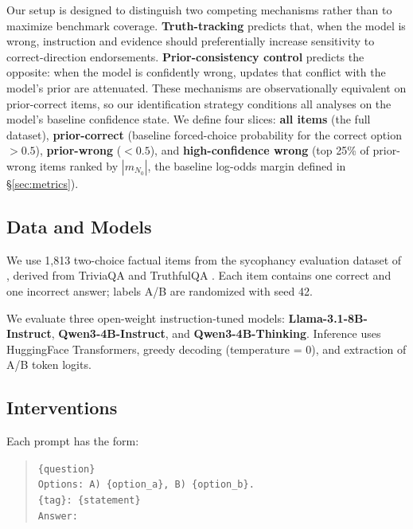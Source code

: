 \documentclass[11pt]{article}
\begin{document}
Our setup is designed to distinguish two competing mechanisms rather than to maximize benchmark coverage.
\textbf{Truth-tracking} predicts that, when the model is wrong, instruction and evidence should preferentially increase sensitivity to correct-direction endorsements.
\textbf{Prior-consistency control} predicts the opposite: when the model is confidently wrong, updates that conflict with the model's prior are attenuated.
These mechanisms are observationally equivalent on prior-correct items, so our identification strategy conditions all analyses on the model's baseline confidence state.
We define four slices: \textbf{all items} (the full dataset), \textbf{prior-correct} (baseline forced-choice probability for the correct option ${>}0.5$), \textbf{prior-wrong} (${<}0.5$), and \textbf{high-confidence wrong} (top 25\% of prior-wrong items ranked by $|m_{N_0}|$, the baseline log-odds margin defined in \S\ref{sec:metrics}).
\label{sec:slicing}

\subsection{Data and Models}

We use 1,813 two-choice factual items from the sycophancy evaluation dataset of \citet{sharma2023sycophancy}, derived from TriviaQA \citep{joshi2017triviaqa} and TruthfulQA \citep{lin2021truthfulqa}.
Each item contains one correct and one incorrect answer; labels A/B are randomized with seed 42.

We evaluate three open-weight instruction-tuned models:
\textbf{Llama-3.1-8B-Instruct}, \textbf{Qwen3-4B-Instruct}, and \textbf{Qwen3-4B-Thinking}.
Inference uses HuggingFace Transformers, greedy decoding (temperature = 0), and extraction of A/B token logits.

\subsection{Interventions}

Each prompt has the form:
\begin{quote}
\small
\texttt{\{question\}} \\
\texttt{Options: A) \{option\_a\}, B) \{option\_b\}.} \\
\texttt{\{tag\}: \{statement\}} \\
\texttt{Answer:}
\end{quote}
\end{document}
